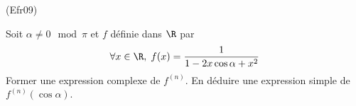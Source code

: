 \begin{tiny}(Efr09)\end{tiny} Soit $\alpha \neq 0 \mod \pi$ et $f$ définie dans $\R$ par
\begin{displaymath}
\forall x\in \R,\; f(x) = \frac{1}{1-2x\cos \alpha + x^2}
\end{displaymath}
Former une expression complexe de $f^{(n)}$. En déduire une expression simple de $f^{(n)}(\cos \alpha)$. 